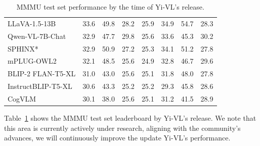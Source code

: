 \documentclass[numbers,sort&compress]{article}
\begin{document}
\begin{table}[t!]
\begin{tabular}{@{}lccccccc@{}}
LLaVA-1.5-13B            & 33.6             & 49.8                   & 28.2              & 25.9             & 34.9                        & 54.7                         & 28.3                   \\
Qwen-VL-7B-Chat          & 32.9             & 47.7                   & 29.8              & 25.6             & 33.6                        & 45.3                         & 30.2                   \\
SPHINX*                  & 32.9             & 50.9                   & 27.2              & 25.3             & 34.1                        & 51.2                         & 27.8                   \\
mPLUG-OWL2              & 32.1             & 48.5                   & 25.6              & 24.9             & 32.8                        & 46.7                         & 29.6                   \\
BLIP-2 FLAN-T5-XL        & 31.0             & 43.0                   & 25.6              & 25.1             & 31.8                        & 48.0                         & 27.8                   \\
InstructBLIP-T5-XL       & 30.6             & 43.3                   & 25.2              & 25.2             & 29.3                        & 45.8                         & 28.6                   \\
CogVLM                   & 30.1             & 38.0                   & 25.6              & 25.1             & 31.2                        & 41.5                         & 28.9                   \\ \bottomrule
\end{tabular}
\caption{\label{tab:yi_vl_mmmu}MMMU test set
 performance by the time of Yi-VL's release.}
\end{table}

Table~\ref{tab:yi_vl_mmmu} shows the MMMU test set leaderboard by Yi-VL's release. We note that this area is currently actively under research, aligning with the community's advances, we will continuously improve the update Yi-VL's performance. 
\end{document}
